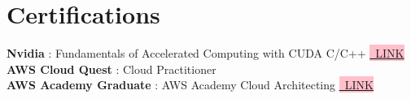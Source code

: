 \section{Certifications}
 \begin{itemize}[leftmargin=0.15in, label={}]
    \small{\item{
     \textbf{Nvidia} : Fundamentals of Accelerated Computing with CUDA C/C++\hspace{0.2cm} \colorbox{pink}{\href{https://courses.nvidia.com/certificates/f4562fbcfdb54cc086b362b4a8e33f64/}{\tiny\ LINK}} \\
     \textbf{AWS Cloud Quest} : Cloud Practitioner \\
     \textbf{AWS Academy Graduate} : AWS Academy Cloud Architecting\hspace{0.2cm} \colorbox{pink}{\href{https://www.credly.com/go/lq267fnl}{\tiny\ LINK}}
    }}
 \end{itemize}
 \vspace{-16pt}
